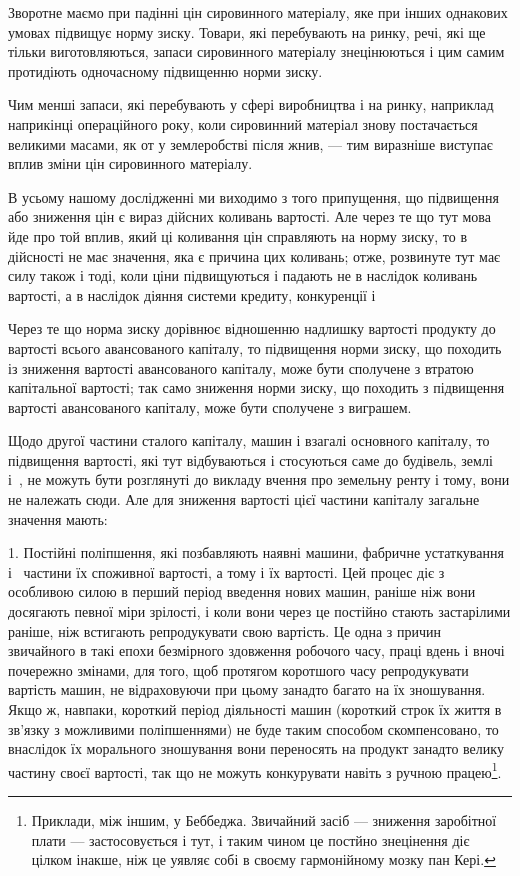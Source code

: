 Зворотне маємо при падінні цін сировинного матеріалу, яке
при інших однакових умовах підвищує норму зиску. Товари, які
перебувають на ринку, речі, які ще тільки виготовляються,
запаси сировинного матеріалу знецінюються і цим самим протидіють
одночасному підвищенню норми зиску.

Чим менші запаси, які перебувають у сфері виробництва
і на ринку, наприклад наприкінці операційного року, коли сировинний
матеріал знову постачається великими масами, як от у землеробстві після жнив, — тим
виразніше виступає вплив зміни цін сировинного матеріалу.

В усьому нашому дослідженні ми виходимо з того припущення, що підвищення або зниження цін є вираз
дійсних коливань вартості. Але через те що тут мова йде про той вплив, який ці коливання цін
справляють на норму зиску, то в дійсності не має значення, яка є причина цих коливань; отже,
розвинуте тут має силу також і тоді, коли ціни підвищуються і падають не в наслідок коливань
вартості, а в наслідок діяння системи кредиту, конкуренції і~

Через те що норма зиску дорівнює відношенню надлишку вартості продукту до вартості всього
авансованого капіталу, то підвищення норми зиску, що походить із зниження вартості авансованого
капіталу, може бути сполучене з втратою капітальної вартості; так само зниження норми зиску, що
походить з підвищення вартості авансованого капіталу, може бути сполучене з виграшем.

Щодо другої частини сталого капіталу, машин і взагалі основного капіталу, то підвищення вартості,
які тут відбуваються і стосуються саме до будівель, землі і~, не можуть бути розглянуті до
викладу вчення про земельну ренту і тому, вони не належать сюди. Але для зниження вартості цієї
частини капіталу загальне значення мають:

1. Постійні поліпшення, які позбавляють наявні машини, фабричне устаткування і~ частини їх
споживної вартості,
а тому і їх вартості. Цей процес діє з особливою силою в перший період введення нових машин, раніше
ніж вони досягають певної міри зрілості, і коли вони через це постійно стають застарілими раніше,
ніж встигають репродукувати свою вартість. Це одна з причин звичайного в такі епохи безмірного
здовження робочого часу, праці вдень і вночі почережно змінами, для того, щоб протягом коротшого
часу репродукувати вартість машин, не відраховуючи при цьому занадто багато на їх зношування. Якщо
ж, навпаки, короткий період діяльності
машин (короткий строк їх життя в зв’язку з можливими поліпшеннями) не буде таким способом
скомпенсовано, то внаслідок їх морального зношування вони переносять на продукт занадто велику
частину своєї вартості, так що не можуть конкурувати навіть з ручною працею\footnote{Приклади, між іншим,
у Беббеджа. Звичайний засіб — зниження заробітної плати — застосовується і тут, і таким чином це постйно
знецінення діє цілком інакше, ніж це уявляє собі в своєму гармонійному мозку пан Кері.
}.

